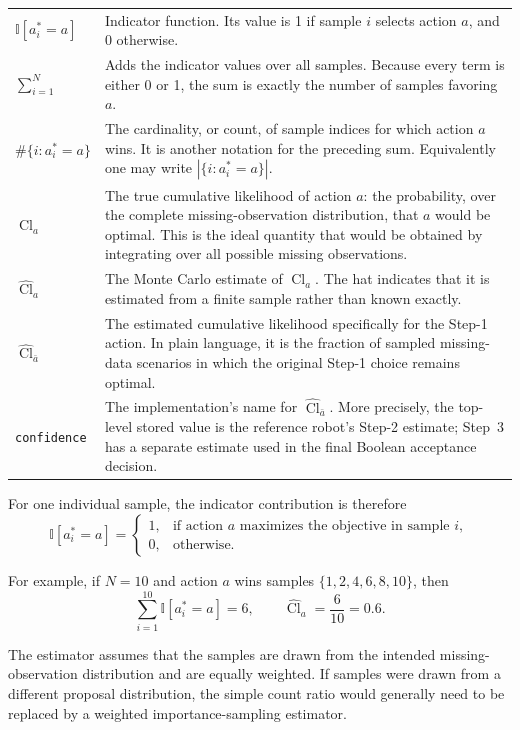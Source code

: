 \documentclass[11pt,a4paper]{article}
\newcommand{\Cl}{\operatorname{Cl}}
\newcommand{\I}{\mathbb{I}}
\begin{document}
\begin{longtable}{>{\raggedright\arraybackslash}p{}
                  >{\raggedright\arraybackslash}p{}}
$\I[a_i^*=a]$ & Indicator function.  Its value is 1 if sample $i$ selects action $a$, and 0 otherwise. \\

$\sum_{i=1}^{N}$ & Adds the indicator values over all samples.  Because every term is either 0 or 1, the sum is exactly the number of samples favoring $a$. \\

$\#\{i:a_i^*=a\}$ & The cardinality, or count, of sample indices for which action $a$ wins.  It is another notation for the preceding sum.  Equivalently one may write $|\{i:a_i^*=a\}|$. \\

$\Cl_a$ & The true cumulative likelihood of action $a$: the probability, over the complete missing-observation distribution, that $a$ would be optimal.  This is the ideal quantity that would be obtained by integrating over all possible missing observations. \\

$\widehat{\Cl}_a$ & The Monte Carlo estimate of $\Cl_a$.  The hat indicates that it is estimated from a finite sample rather than known exactly. \\

$\widehat{\Cl}_{\bar a}$ & The estimated cumulative likelihood specifically for the Step-1 action.  In plain language, it is the fraction of sampled missing-data scenarios in which the original Step-1 choice remains optimal. \\

\texttt{confidence} & The implementation's name for $\widehat{\Cl}_{\bar a}$.  More precisely, the top-level stored value is the reference robot's Step-2 estimate; Step~3 has a separate estimate used in the final Boolean acceptance decision. \\
\end{longtable}

For one individual sample, the indicator contribution is therefore
\[
    \I[a_i^*=a]
    =
    \begin{cases}
        1, & \text{if action $a$ maximizes the objective in sample $i$},\\
        0, & \text{otherwise}.
    \end{cases}
\]

For example, if $N=10$ and action $a$ wins samples
$\{1,2,4,6,8,10\}$, then
\[
    \sum_{i=1}^{10}\I[a_i^*=a]=6,
    \qquad
    \widehat{\Cl}_a=\frac{6}{10}=0.6.
\]

The estimator assumes that the samples are drawn from the intended
missing-observation distribution and are equally weighted.  If samples were
drawn from a different proposal distribution, the simple count ratio would
generally need to be replaced by a weighted importance-sampling estimator.
\end{document}
